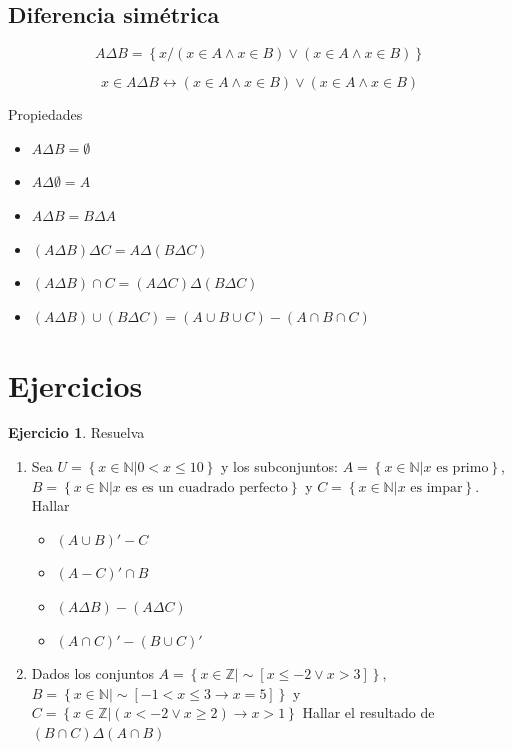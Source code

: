 \documentclass[
  16pt,
]{krantz}
\providecommand{\tightlist}{%
  \setlength{\itemsep}{0pt}\setlength{\parskip}{0pt}}
\theoremstyle{definition}
\theoremstyle{definition}
\theoremstyle{definition}
\newtheorem{exercise}{Ejercicio}[chapter]
\theoremstyle{definition}
\theoremstyle{remark}
\begin{document}
\hypertarget{diferencia-simuxe9trica}{%
\subsection{Diferencia simétrica}\label{diferencia-simuxe9trica}}

\[
A\Delta B=\left\{x/(x\in A\wedge x\in B)\vee (x\in A\wedge x\in B)\right\}
\]

\[
x\in A\Delta B\leftrightarrow (x\in A\wedge x\in B)\vee (x\in A\wedge x\in B)
\]

Propiedades

\begin{itemize}
\tightlist
\item
  \(A\Delta B=\emptyset\)
\item
  \(A\Delta \emptyset=A\)
\item
  \(A\Delta B=B\Delta A\)
\item
  \((A\Delta B)\Delta C=A\Delta(B\Delta C)\)
\item
  \((A\Delta B)\cap C=(A\Delta C)\Delta(B\Delta C)\)
\item
  \((A\Delta B)\cup(B\Delta C)=(A\cup B\cup C)-(A\cap B\cap C)\)
\end{itemize}

\hypertarget{ejercicios}{%
\section{Ejercicios}\label{ejercicios}}

\begin{exercise}

Resuelva

\begin{enumerate}
\def\labelenumi{\arabic{enumi}.}
\tightlist
\item
  Sea \(U=\left\{x\in\mathbb{N}|0<x\leq 10\right\}\) y los subconjuntos: \(A=\left\{x\in\mathbb{N}|x \text{ es primo}\right\}\), \(B=\left\{x\in\mathbb{N}| x\text{ es es un cuadrado perfecto}\right\}\) y \(C=\left\{x\in\mathbb{N}|x\text{ es impar}\right\}\). Hallar

  \begin{itemize}
  \tightlist
  \item
    \((A\cup B)'-C\)
  \item
    \((A-C)'\cap B\)
  \item
    \((A\Delta B)-(A\Delta C)\)
  \item
    \((A\cap C)'-(B\cup C)'\)
  \end{itemize}
\item
  Dados los conjuntos \(A=\left\{x\in\mathbb{Z}|\sim[x\leq -2\vee x>3]\right\}\), \(B=\left\{x\in\mathbb{N}|\sim[-1<x\leq 3 \rightarrow x=5]\right\}\) y \(C=\left\{x\in\mathbb{Z}|(x< -2\vee x\geq 2)\rightarrow x>1\right\}\) Hallar el resultado de \((B\cap C)\Delta(A\cap B)\)
\end{enumerate}

\end{exercise}
\end{document}
